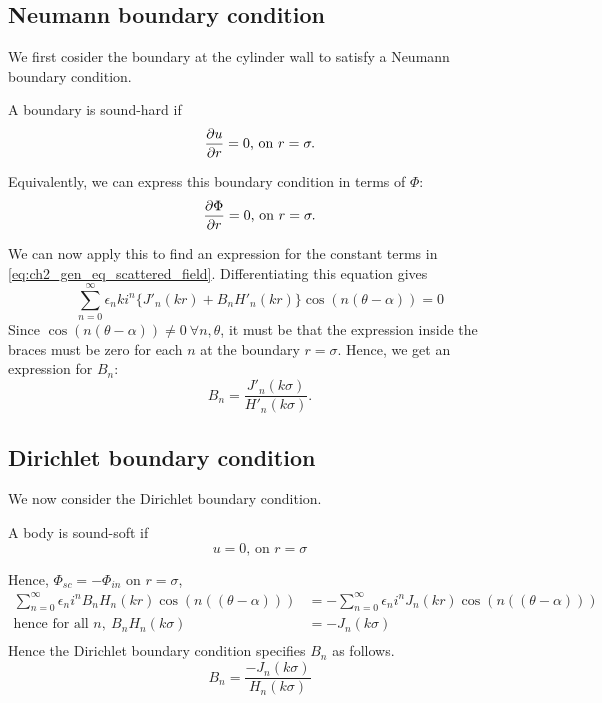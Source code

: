 \subsection{Neumann boundary condition}\label{ss:ch2_neumann_bcs}
We first cosider the boundary at the cylinder wall to satisfy a Neumann boundary condition.
  \begin{defn}
    \cite[$\S$1.3.2]{martin06scattering} A boundary is sound-hard if
      \begin{align*}
        \frac{\partial u}{\partial r} = 0 \text{,  on } r = \sigma.
      \end{align*}
  \end{defn} \par
%
Equivalently, we can express this boundary condition in terms of $\Phi$:
  \begin{align*}
    \frac{\partial \Phi}{\partial r}=0 \text{,  on } r = \sigma.
  \end{align*} \par
%
We can now apply this to find an expression for the constant terms in \eqref{eq:ch2_gen_eq_scattered_field}. Differentiating this equation gives
  \begin{equation}
    \sum^\infty_{n=0} \epsilon_n k i^n
    \{ J'_n(kr) + B_n H'_n(kr) \} \cos(n(\theta-\alpha)) = 0
  \end{equation}
Since $\cos(n(\theta - \alpha)) \neq 0 ~ \forall n, \theta$, it must be that the expression inside the braces must be zero for each $n$ at the boundary $r=\sigma$. Hence, we get an expression for $B_n$:
  \begin{equation}
    B_n= \frac{J'_n(k\sigma)}{H'_n(k\sigma)}.
  \end{equation}
\subsection{Dirichlet boundary condition}\label{ss:ch2_dirichlet_bcs}
We now consider the Dirichlet boundary condition.
  \begin{defn}
    \cite[$\S$1.3.2]{martin06scattering} A body is sound-soft if
      \[
      u = 0 \text{,  on } r = \sigma
      \]
  \end{defn}
Hence, $\Phi_{sc} = - \Phi_{in}$ on $r=\sigma$,
  \begin{align*}
    \sum^\infty_{n=0} \epsilon_n i^n B_n H_n(kr) \cos(n((\theta-\alpha)))
    & = - \sum^\infty_{n=0} \epsilon_n i^n J_n(kr) \cos(n((\theta-\alpha))) \\
    \text{hence for all } n,~ B_n H_n (k\sigma) &= - J_n (k\sigma) \\
  \end{align*}
Hence the Dirichlet boundary condition specifies $B_n$ as follows.
  \begin{equation}
    B_n = \frac{- J_n(k\sigma)}{H_n(k\sigma)}
  \end{equation}
